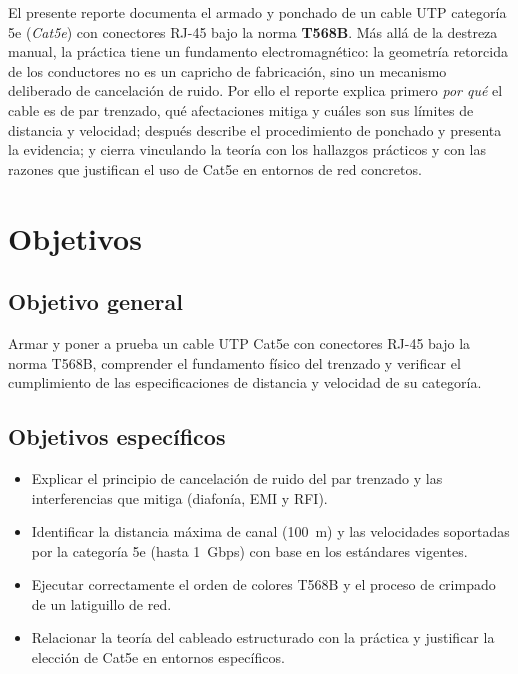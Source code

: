 \documentclass[11pt,a4paper]{article}
\begin{document}
El presente reporte documenta el armado y ponchado de un cable UTP categoría
5e (\textit{Cat5e}) con conectores RJ-45 bajo la norma \textbf{T568B}. Más
allá de la destreza manual, la práctica tiene un fundamento electromagnético:
la geometría retorcida de los conductores no es un capricho de fabricación,
sino un mecanismo deliberado de cancelación de ruido. Por ello el reporte
explica primero \emph{por qué} el cable es de par trenzado, qué afectaciones
mitiga y cuáles son sus límites de distancia y velocidad; después describe el
procedimiento de ponchado y presenta la evidencia; y cierra vinculando la
teoría con los hallazgos prácticos y con las razones que justifican el uso de
Cat5e en entornos de red concretos.

\section{Objetivos}

\subsection*{Objetivo general}

Armar y poner a prueba un cable UTP Cat5e con conectores RJ-45 bajo la norma
T568B, comprender el fundamento físico del trenzado y verificar el
cumplimiento de las especificaciones de distancia y velocidad de su categoría.

\subsection*{Objetivos específicos}

\begin{itemize}
  \item Explicar el principio de cancelación de ruido del par trenzado y las
        interferencias que mitiga (diafonía, EMI y RFI).
  \item Identificar la distancia máxima de canal (100~m) y las velocidades
        soportadas por la categoría 5e (hasta 1~Gbps) con base en los
        estándares vigentes.
  \item Ejecutar correctamente el orden de colores T568B y el proceso de
        crimpado de un latiguillo de red.
  \item Relacionar la teoría del cableado estructurado con la práctica y
        justificar la elección de Cat5e en entornos específicos.
\end{itemize}
\end{document}
